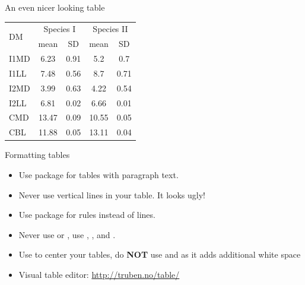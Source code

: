 \documentclass[10pt,times]{beamer}
\begin{document}
\begin{frame}[fragile]{An even nicer looking table}
\begin{exampletwouptinyfifty}
\begin{tabular}{l c c c c}
\toprule
\multirow{2}{*}{DM} 
	& \multicolumn{2}{c}{Species I} 
	& \multicolumn{2}{c}{Species II} \\ 
\cmidrule{2-5}
  & mean & SD  & mean & SD  \\ 
\midrule
I1MD & 6.23 & 0.91 & 5.2  & 0.7  \\

I1LL & 7.48 & 0.56 & 8.7  & 0.71 \\

I2MD & 3.99 & 0.63 & 4.22 & 0.54 \\

I2LL & 6.81 & 0.02 & 6.66 & 0.01 \\

CMD & 13.47 & 0.09 & 10.55 & 0.05 \\

CBL & 11.88 & 0.05 & 13.11 & 0.04\\ 
\bottomrule
\end{tabular}
\end{exampletwouptinyfifty}
\end{frame}


\begin{frame}[fragile]{Formatting tables}
\begin{itemize}
\item Use  package for tables with paragraph text.

\item Never use vertical lines in your table. It looks ugly!

\item Use  package for rules instead of lines.

\item Never use  or , use , 
,  and .

\item Use  to center your tables, do 
\textbf{NOT} use  and  as it adds additional 
white space

\item Visual table editor: 
\href{http://truben.no/table/}{http://truben.no/table/}
\end{itemize}
\end{frame}
\end{document}
